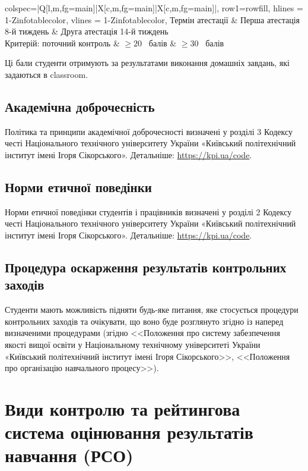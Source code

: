 \documentclass{Syllabus}
\begin{document}
\begin{center}
	\begin{tblr}{
        colspec={|Q[l,m,fg=main]|X[c,m,fg=main]|X[c,m,fg=main]|},
        row{1}={rowfill},
        hlines = {1-Z}{infotablecolor},
        vlines = {1-Z}{infotablecolor},
        }
	    Термін атестації        & {Перша атестація 8-й тиждень} & {Друга атестація 14-й тиждень}  \\
	    Критерій: поточний контроль & $\ge 20$~ балів               & $\ge 30$~ балів                \\
	\end{tblr}
\end{center}

Ці бали студенти отримують за результатами виконання домашніх завдань, які задаються в class\-room.

\subsection*{Академічна доброчесність}

Політика та принципи академічної доброчесності визначені у розділі 3 Кодексу честі Національного технічного університету України «Київський політехнічний інститут імені Ігоря Сікорського». Детальніше: \url{https://kpi.ua/code}.

\subsection*{Норми етичної поведінки}

Норми етичної поведінки студентів і працівників визначені у розділі 2 Кодексу честі Національного технічного університету України «Київський політехнічний інститут імені Ігоря Сікорського». Детальніше: \url{https://kpi.ua/code}.

\subsection*{Процедура оскарження результатів контрольних заходів}

Студенти мають можливість підняти будь-яке питання, яке стосується процедури контрольних заходів та очікувати, що воно буде розглянуто згідно із наперед визначеними процедурами (згідно <<Положення про систему забезпечення якості вищої освіти у Національному технічному університеті України «Київський політехнічний інститут імені Ігоря Сікорського>>, <<Положення про організацію навчального процесу>>).

\section{Види контролю та рейтингова система оцінювання результатів навчання (РСО)}
\end{document}
